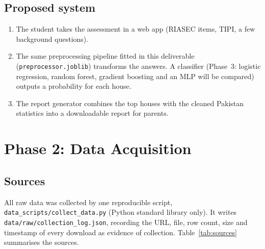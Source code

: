 \documentclass[11pt,a4paper]{article}
\begin{document}
\subsection{Proposed system}
\begin{enumerate}
\item The student takes the assessment in a web app (RIASEC items, TIPI, a few background
      questions).
\item The same preprocessing pipeline fitted in this deliverable (\texttt{preprocessor.joblib})
      transforms the answers. A classifier (Phase~3: logistic regression, random forest,
      gradient boosting and an MLP will be compared) outputs a probability for each house.
\item The report generator combines the top houses with the cleaned Pakistan statistics into a
      downloadable report for parents.
\end{enumerate}

\section{Phase 2: Data Acquisition}

\subsection{Sources}
All raw data was collected by one reproducible script, \texttt{data\_scripts/collect\_data.py}
(Python standard library only). It writes \texttt{data/raw/collection\_log.json}, recording the
URL, file, row count, size and timestamp of every download as evidence of collection.
Table~\ref{tab:sources} summarises the sources.
\end{document}
